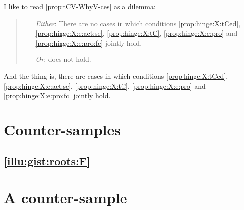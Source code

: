 \begin{note}
  I like to read \autoref{prop:tCV-WhyV-ces} as a dilemma:

  \begin{quote}
    \begin{itemize}[labelwidth = ]
    \item[\emph{Either}:]
      There are no cases in which conditions \ref{prop:hinge:X:tCed}, \ref{prop:hinge:X:e:act:se}, \ref{prop:hinge:X:tC}, \ref{prop:hinge:X:e:pro} and \ref{prop:hinge:X:e:pro:fc} jointly hold.
    \item[\emph{Or}:]
      \issueInclusion{} does not hold.
    \end{itemize}
  \end{quote}
  And the thing is, there are cases in which conditions \ref{prop:hinge:X:tCed}, \ref{prop:hinge:X:e:act:se}, \ref{prop:hinge:X:tC}, \ref{prop:hinge:X:e:pro} and \ref{prop:hinge:X:e:pro:fc} jointly hold.
\end{note}




\section{Counter-samples}
\label{sec:counter-samples}




\subsection{\autoref{illu:gist:roots:F}}





\section{A counter-sample}

